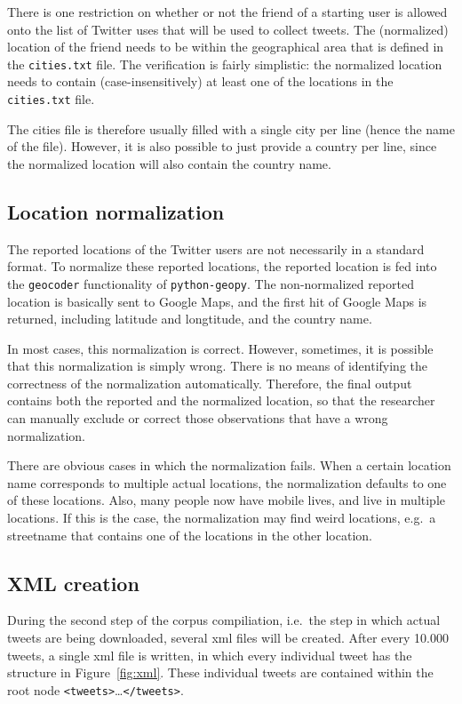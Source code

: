 \documentclass[a4paper,10pt]{article}
\begin{document}
There is one restriction on whether or not the friend of a starting user is allowed onto the list of Twitter uses that will be used to collect tweets. The (normalized) location of the friend needs to be within the geographical area that is defined in the \texttt{cities.txt} file. The verification is fairly simplistic: the normalized location needs to contain (case-insensitively) at least one of the locations in the \texttt{cities.txt} file.

The cities file is therefore usually filled with a single city per line (hence the name of the file). However, it is also possible to just provide a country per line, since the normalized location will also contain the country name.

\subsection{Location normalization}

The reported locations of the Twitter users are not necessarily in a standard format. To normalize these reported locations, the reported location is fed into the \texttt{geocoder} functionality of \texttt{python-geopy}. The non-normalized reported location is basically sent to Google Maps, and the first hit of Google Maps is returned, including latitude and longtitude, and the country name.

In most cases, this normalization is correct. However, sometimes, it is possible that this normalization is simply wrong. There is no means of identifying the correctness of the normalization automatically. Therefore, the final output contains both the reported and the normalized location, so that the researcher can manually exclude or correct those observations that have a wrong normalization.

There are obvious cases in which the normalization fails. When a certain location name corresponds to multiple actual locations, the normalization defaults to one of these locations. Also, many people now have mobile lives, and live in multiple locations. If this is the case, the normalization may find weird locations, e.g.~a streetname that contains one of the locations in the other location.

\subsection{XML creation}

During the second step of the corpus compiliation, i.e.~the step in which actual tweets are being downloaded, several xml files will be created. After every 10.000 tweets, a single xml file is written, in which every individual tweet has the structure in Figure~\ref{fig:xml}. These individual tweets are contained within the root node \texttt{<tweets>}\ldots\texttt{</tweets>}.
\end{document}
